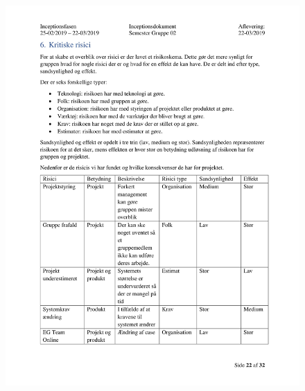 \begin{figure}[hb]
  \includegraphics[scale = 0.33]{./PNG/Inceptions/Gruppe 02 + InceptionsDokument-23.jpg} 
\end{figure}

